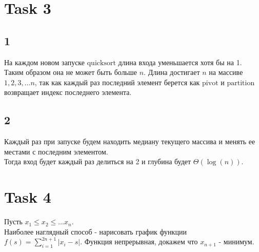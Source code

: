 \documentclass[12pt]{exam}
\begin{document}
\section*{Task 3}
\subsection*{1}
На каждом новом запуске $\mathrm{quicksort}$ длина входа уменьшается хотя бы на 1. 
Таким образом она не может быть больше $n$. 
Длина достигает $n$ на массиве $1, 2, 3, \ldots n$, так как каждый раз последний элемент берется как $\mathrm{pivot}$ 
и $\mathrm{partition}$ возвращает индекс последнего элемента.

\subsection*{2}
Каждый раз при запуске будем находить медиану текущего массива и менять ее местами с последним элементом.\\
Тогда вход будет каждый раз делиться на 2 и глубина будет $\Theta(\log(n))$.

\section*{Task 4}
Пусть $x_1 \leq x_2 \leq \ldots x_n$.\\
Наиболее наглядный способ - нарисовать график функции $f(s) = \sum_{i = 1}^{2n + 1} | x_i - s |$.
Функция непрерывная, докажем что $x_{n+1}$ - минимум. 

 
\end{document}

